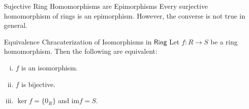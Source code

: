 \begin{proposition}{Sujective Ring Homomorphisms are Epimorphisms}{}
    Every surjective homomorphism of rings is an epimorphism. However, the converse is not true in general.
\end{proposition}


\begin{proposition}{Equivalence Chracaterization of Isomorphisms in $\mathsf{Ring}$}{}
    Let $f:R\to S$ be a ring homomorphism. Then the following are equivalent:
    \begin{enumerate}[(i)]
        \item $f$ is an isomorphism.
        \item $f$ is bijective.
        \item $\ker f=\{0_R\}$ and $\mathrm{im}f=S$. 
    \end{enumerate}
\end{proposition}




